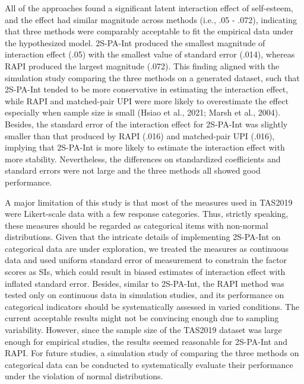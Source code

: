 \documentclass[
  man]{apa7}
\begin{document}
All of the approaches found a significant latent interaction effect of self-esteem, and the effect had similar magnitude across methods (i.e., .05 - .072), indicating that three methods were comparably acceptable to fit the empirical data under the hypothesized model. 2S-PA-Int produced the smallest magnitude of interaction effect (.05) with the smallest value of standard error (.014), whereas RAPI produced the largest magnitude (.072). This finding aligned with the simulation study comparing the three methods on a generated dataset, such that 2S-PA-Int tended to be more conservative in estimating the interaction effect, while RAPI and matched-pair UPI were more likely to overestimate the effect especially when sample size is small (Hsiao et al., 2021; Marsh et al., 2004). Besides, the standard error of the interaction effect for 2S-PA-Int was slightly smaller than that produced by RAPI (.016) and matched-pair UPI (.016), implying that 2S-PA-Int is more likely to estimate the interaction effect with more stability. Nevertheless, the differences on standardized coefficients and standard errors were not large and the three methods all showed good performance.

A major limitation of this study is that most of the measures used in TAS2019 were Likert-scale data with a few response categories. Thus, strictly speaking, these measures should be regarded as categorical items with non-normal distributions. Given that the intricate details of implementing 2S-PA-Int on categorical data are under exploration, we treated the measures as continuous data and used uniform standard error of measurement to constrain the factor scores as SIs, which could result in biased estimates of interaction effect with inflated standard error. Besides, similar to 2S-PA-Int, the RAPI method was tested only on continuous data in simulation studies, and its performance on categorical indicators should be systematically assessed in varied conditions. The current acceptable results might not be convincing enough due to sampling variability. However, since the sample size of the TAS2019 dataset was large enough for empirical studies, the results seemed reasonable for 2S-PA-Int and RAPI. For future studies, a simulation study of comparing the three methods on categorical data can be conducted to systematically evaluate their performance under the violation of normal distributions.
\end{document}
